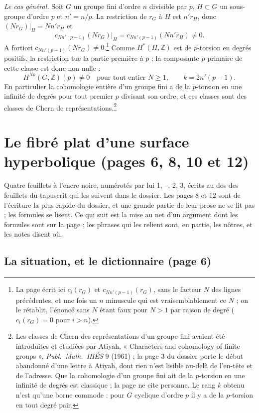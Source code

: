\documentclass[11pt,a4paper]{article}
\begin{document}
\emph{Le cas général.} Soit $G$ un groupe fini d'ordre $n$ divisible par $p$,
$H \subset G$ un sous-groupe d'ordre $p$ et $n' = n/p$. La restriction de
$r_{G}$ à $H$ est $n' r_{H}$, donc $(N r_{G})|_{H} = N n' r_{H}$ et
\[
  c_{N n'(p-1)}(N r_{G})|_{H} = c_{N n'(p-1)}(N n' r_{H}) \neq 0 .
\]
A fortiori $c_{N n'(p-1)}(N r_{G}) \neq 0$.\footnote{La page écrit ici
$c_{i}(r_{G})$ et $c_{N n'(p-1)}(r_{G})$, sans le facteur $N$ des lignes
précédentes, et une fois un $n$ minuscule qui est vraisemblablement ce $N$ ;
on le rétablit, l'énoncé sans $N$ étant faux pour $N > 1$ par raison de
degré ($c_{i}(r_{G}) = 0$ pour $i > n$).} Comme $H^{*}(H,\mathbb{Z})$ est de
$p$-torsion en degrés positifs, la restriction tue la partie première à $p$ ;
la composante $p$-primaire de cette classe est donc non nulle :
\[
  \boxed{H^{Nk}(G,\mathbb{Z})(p) \neq 0 \quad \text{pour tout entier } N \geq 1,
  \qquad k = 2n'(p-1).}
\]
En particulier la cohomologie entière d'un groupe fini a de la $p$-torsion en
une infinité de degrés pour tout premier $p$ divisant son ordre, et ces
classes sont des classes de Chern de représentations.\footnote{Les classes de
Chern des représentations d'un groupe fini avaient été introduites et
étudiées par Atiyah, « Characters and cohomology of finite groups »,
\emph{Publ.\ Math.\ IHÉS} 9 (1961) ; la page 3 du dossier porte le début
abandonné d'une lettre à Atiyah, dont rien n'est lisible au-delà de
l'en-tête et de l'adresse. Que la cohomologie d'un groupe fini ait de la
$p$-torsion en une infinité de degrés est classique ; la page ne cite
personne. Le rang $k$ obtenu n'est qu'une borne commode : pour $G$ cyclique
d'ordre $p$ il y a de la $p$-torsion en tout degré pair.}

\section*{Le fibré plat d'une surface hyperbolique (pages 6, 8, 10 et 12)}

Quatre feuillets à l'encre noire, numérotés par lui 1, --, 2, 3, écrits au dos
des feuillets du tapuscrit qui les suivent dans le dossier. Les pages 8 et 12
sont de l'écriture la plus rapide du dossier, et une grande partie de leur
prose ne se lit pas ; les formules se lisent. Ce qui suit est la mise au net
d'un argument dont les formules sont sur la page ; les phrases qui les
relient sont, en partie, les nôtres, et les notes disent où.

\subsection*{La situation, et le dictionnaire (page 6)}
\end{document}
